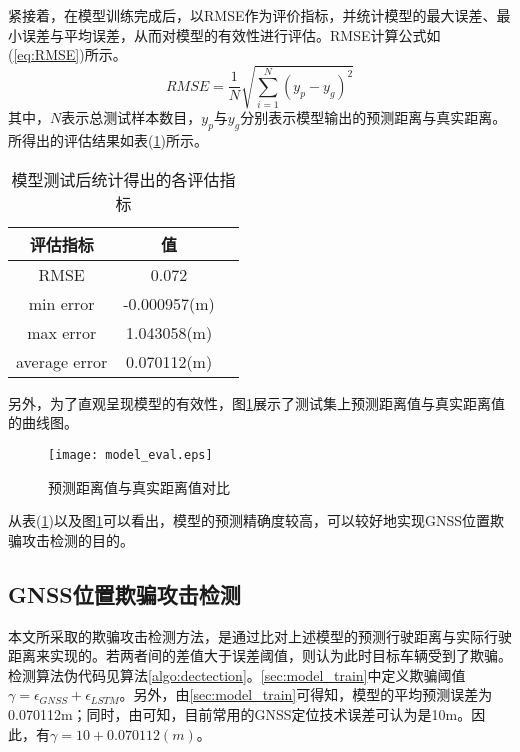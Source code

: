 紧接着，在模型训练完成后，以RMSE作为评价指标，并统计模型的最大误差、最小误差与平均误差，从而对模型的有效性进行评估。RMSE计算公式如(\ref{eq:RMSE})所示。
\begin{equation}
    RMSE=\frac{1}{N}\sqrt{\sum_{i=1}^N(y_p-y_g)^2}
    \label{eq:RMSE}
\end{equation}
其中，$N$表示总测试样本数目，$y_p$与$y_g$分别表示模型输出的预测距离与真实距离。所得出的评估结果如表(\ref{tab:metrics})所示。

\begin{table}
    \begin{center}
    \begin{tabular}{ccl}
        \toprule
        评估指标 & 值 \\
        \midrule
        RMSE & 0.072 \\
        min error & -0.000957(m) \\
        max error & 1.043058(m) \\
        average error & 0.070112(m) \\
        \bottomrule
    \end{tabular}
    \end{center}
    \caption{模型测试后统计得出的各评估指标}
    \label{tab:metrics}
\end{table}

另外，为了直观呈现模型的有效性，图\ref{fig:model_eval}展示了测试集上预测距离值与真实距离值的曲线图。
\begin{figure}[htbp]
    \begin{center}
        \texttt{[image: model\_eval.eps]}
    \end{center}
    \caption{预测距离值与真实距离值对比}
    \label{fig:model_eval}
\end{figure}
从表(\ref{tab:metrics})以及图\ref{fig:model_eval}可以看出，模型的预测精确度较高，可以较好地实现GNSS位置欺骗攻击检测的目的。

\subsection{GNSS位置欺骗攻击检测}
本文所采取的欺骗攻击检测方法，是通过比对上述模型的预测行驶距离与实际行驶距离来实现的。若两者间的差值大于误差阈值，则认为此时目标车辆受到了欺骗。检测算法伪代码见算法\ref{algo:dectection}。\ref{sec:model_train}中定义欺骗阈值$\gamma=\epsilon_{GNSS}+\epsilon_{LSTM}$。另外，由\ref{sec:model_train}可得知，模型的平均预测误差为0.070112m；同时，由\cite{kaplan2005understanding}可知，目前常用的GNSS定位技术误差可认为是10m。因此，有$\gamma=10+0.070112(m)$。

